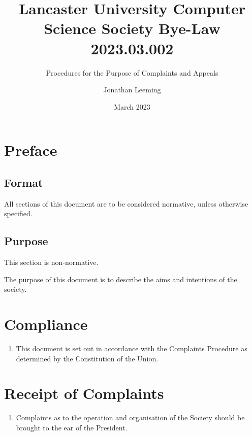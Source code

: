 \documentclass{scrartcl}
\title{Lancaster University Computer Science Society Bye-Law 2023.03.002}
\subtitle{Procedures for the Purpose of Complaints and Appeals}
\author{Jonathan Leeming}
\date{March 2023}
\begin{document}
    \maketitle
    
    \clearpage
    \tableofcontents

    \clearpage
    \section{Preface}
        \label{preface}
        \subsection{Format}
            \label{preface--format}
            All sections of this document are to be considered normative, unless otherwise specified.

        \subsection{Purpose}
            \label{preface--purpose}
            This section is non-normative.

            The purpose of this document is to describe the aims and intentions of the society.

    \clearpage
    \section{Compliance}
        \label{compliance}
        \begin{enumerate}
            \item This document is set out in accordance with the Complaints Procedure as determined by the Constitution of the Union.
        \end{enumerate}

    \clearpage
    \section{Receipt of Complaints}
        \label{receipt}
        \begin{enumerate}
            \item Complaints as to the operation and organisation of the Society should be brought to the ear of the President.
        \end{enumerate}
\end{document}
